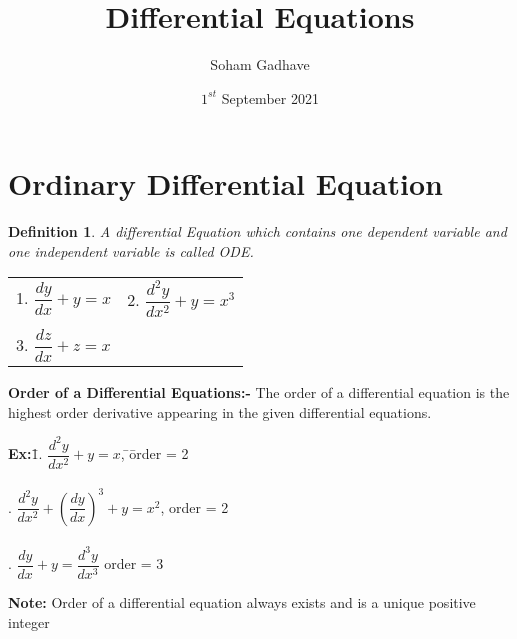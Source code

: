 \documentclass[a4paper, titlepage]{article}
\title{Differential Equations}
\author{Soham Gadhave}
\date{$1^{st}$ September 2021}
\newtheorem{definition}{Definition}[section]
\begin{document}
\maketitle
\section{Ordinary Differential Equation}

\begin{definition}
    A differential Equation which contains one dependent variable 
    and one independent variable is called ODE.
\end{definition}
    \begin{center}
        \begin{tabular}{l r}
             1. $ \dfrac{dy}{dx} + y = x$ & 2. $ \dfrac{d^2y}{dx^2} + y = x^3$ \\ \\
             3. $ \dfrac{dz}{dx} + z = x$ & 
        \end{tabular}
    \end{center}
    \textbf{Order of a Differential Equations:-} The order of a differential equation is the highest order derivative appearing in the given differential equations.
    \begin{tabbing}
    \textbf{Ex:}\hspace{1em}\= 1. $ \dfrac{d^2y}{dx^2} + y = x$, \hspace{30pt}\=\hspace{30pt}\= order = 2  \\ \\
        . $ \dfrac{d^2y}{dx^2} + \left( \dfrac{dy}{dx} \right)^3 + y = x^2$, \> \> order = 2  \\ \\
        . $ \dfrac{dy}{dx} + y = \dfrac{d^3y}{dx^3} $ \> \> order = 3
    \end{tabbing}
    \textbf{Note:} Order of a differential equation always exists and is a unique positive integer
    
\end{document}
